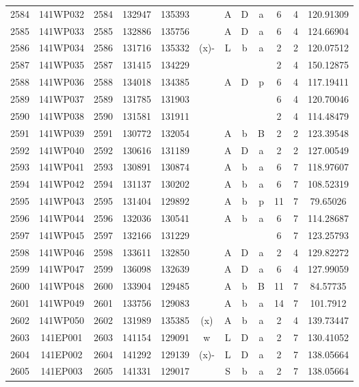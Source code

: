 \begin{tabular}{|*{12}{c|}}
2584 & 141WP032 & 2584 & 132947 & 135393 &  & A & D & a & 6 & 4 & 120.91309 \\ 
2585 & 141WP033 & 2585 & 132886 & 135756 &  & A & D & a & 6 & 4 & 124.66904 \\ 
2586 & 141WP034 & 2586 & 131716 & 135332 & (x)- & L & b & a & 2 & 2 & 120.07512 \\ 
2587 & 141WP035 & 2587 & 131415 & 134229 &  &  &  &  & 2 & 4 & 150.12875 \\ 
2588 & 141WP036 & 2588 & 134018 & 134385 &  & A & D & p & 6 & 4 & 117.19411 \\ 
2589 & 141WP037 & 2589 & 131785 & 131903 &  &  &  &  & 6 & 4 & 120.70046 \\ 
2590 & 141WP038 & 2590 & 131581 & 131911 &  &  &  &  & 2 & 4 & 114.48479 \\ 
2591 & 141WP039 & 2591 & 130772 & 132054 &  & A & b & B & 2 & 2 & 123.39548 \\ 
2592 & 141WP040 & 2592 & 130616 & 131189 &  & A & D & a & 2 & 2 & 127.00549 \\ 
2593 & 141WP041 & 2593 & 130891 & 130874 &  & A & b & a & 6 & 7 & 118.97607 \\ 
2594 & 141WP042 & 2594 & 131137 & 130202 &  & A & b & a & 6 & 7 & 108.52319 \\ 
2595 & 141WP043 & 2595 & 131404 & 129892 &  & A & b & p & 11 & 7 & 79.65026 \\ 
2596 & 141WP044 & 2596 & 132036 & 130541 &  & A & b & a & 6 & 7 & 114.28687 \\ 
2597 & 141WP045 & 2597 & 132166 & 131229 &  &  &  &  & 6 & 7 & 123.25793 \\ 
2598 & 141WP046 & 2598 & 133611 & 132850 &  & A & D & a & 2 & 4 & 129.82272 \\ 
2599 & 141WP047 & 2599 & 136098 & 132639 &  & A & D & a & 6 & 4 & 127.99059 \\ 
2600 & 141WP048 & 2600 & 133904 & 129485 &  & A & b & B & 11 & 7 & 84.57735 \\ 
2601 & 141WP049 & 2601 & 133756 & 129083 &  & A & b & a & 14 & 7 & 101.7912 \\ 
2602 & 141WP050 & 2602 & 131989 & 135385 & (x) & A & b & a & 2 & 4 & 139.73447 \\ 
2603 & 141EP001 & 2603 & 141154 & 129091 & w & L & D & a & 2 & 7 & 130.41052 \\ 
2604 & 141EP002 & 2604 & 141292 & 129139 & (x)- & L & D & a & 2 & 7 & 138.05664 \\ 
2605 & 141EP003 & 2605 & 141331 & 129017 &  & S & b & a & 2 & 7 & 138.05664 \\ 

\end{tabular}
